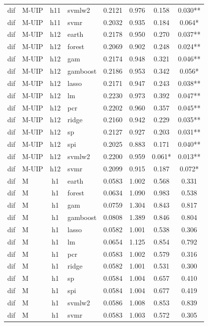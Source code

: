 \begin{ThreePartTable}
\begin{longtable}[t]{llclcccc}
dif & M-UIP & h11 & svmlw2 & 0.2121 & 0.976 & 0.158 & 0.030**\\
dif & M-UIP & h11 & svmr & 0.2032 & 0.935 & 0.184 & 0.064*\\
\addlinespace
dif & M-UIP & h12 & earth & 0.2178 & 0.950 & 0.270 & 0.037**\\
dif & M-UIP & h12 & forest & 0.2069 & 0.902 & 0.248 & 0.024**\\
dif & M-UIP & h12 & gam & 0.2174 & 0.948 & 0.321 & 0.046**\\
dif & M-UIP & h12 & gamboost & 0.2186 & 0.953 & 0.342 & 0.056*\\
dif & M-UIP & h12 & lasso & 0.2171 & 0.947 & 0.243 & 0.038**\\
dif & M-UIP & h12 & lm & 0.2230 & 0.973 & 0.392 & 0.047**\\
dif & M-UIP & h12 & pcr & 0.2202 & 0.960 & 0.357 & 0.045**\\
dif & M-UIP & h12 & ridge & 0.2160 & 0.942 & 0.229 & 0.035**\\
dif & M-UIP & h12 & sp & 0.2127 & 0.927 & 0.203 & 0.031**\\
dif & M-UIP & h12 & spi & 0.2025 & 0.883 & 0.171 & 0.040**\\
dif & M-UIP & h12 & svmlw2 & 0.2200 & 0.959 & 0.061* & 0.013**\\
dif & M-UIP & h12 & svmr & 0.2099 & 0.915 & 0.187 & 0.072*\\
\addlinespace
dif & M & h1 & earth & 0.0583 & 1.002 & 0.568 & 0.331\\
dif & M & h1 & forest & 0.0634 & 1.090 & 0.983 & 0.538\\
dif & M & h1 & gam & 0.0759 & 1.304 & 0.843 & 0.817\\
dif & M & h1 & gamboost & 0.0808 & 1.389 & 0.846 & 0.804\\
dif & M & h1 & lasso & 0.0582 & 1.001 & 0.538 & 0.306\\
dif & M & h1 & lm & 0.0654 & 1.125 & 0.854 & 0.792\\
dif & M & h1 & pcr & 0.0583 & 1.002 & 0.579 & 0.316\\
dif & M & h1 & ridge & 0.0582 & 1.001 & 0.531 & 0.300\\
dif & M & h1 & sp & 0.0584 & 1.004 & 0.657 & 0.410\\
dif & M & h1 & spi & 0.0584 & 1.004 & 0.677 & 0.419\\
dif & M & h1 & svmlw2 & 0.0586 & 1.008 & 0.853 & 0.839\\
dif & M & h1 & svmr & 0.0583 & 1.003 & 0.572 & 0.305\\

\end{longtable}
\end{ThreePartTable}
